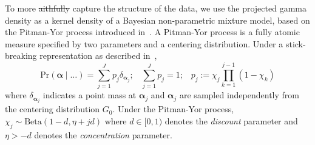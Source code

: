 To more \st{aithfully}  capture the structure of the data, we use the projected gamma density 
    as a kernel density of a Bayesian non-parametric mixture model, based on 
    the Pitman-Yor process introduced in~\cite{perman1992}.  A Pitman-Yor process
    is a fully atomic measure specified by two parameters and a centering
    distribution.  Under a stick-breaking representation as described 
    in~\cite{ishwaran2001}, 
    \begin{equation}
        \label{eqn:stickbreak}
        \text{Pr}(\bm{\alpha}\mid\ldots) 
            = \sum_{j = 1}^Jp_j\delta_{\bm{\alpha}_j};\;\;\;
            \sum_{j=1}^Jp_j = 1;\;\;\;
            p_j := \chi_j\prod_{k = 1}^{j-1}(1 - \chi_k)
    \end{equation}
    where $\delta_{\bm{\alpha}_j}$ indicates a point mass at $\bm{\alpha}_j$ and
    $\bm{\alpha}_j$ are sampled independently from the centering distribution $G_0$.
    Under the Pitman-Yor process, $\chi_j \sim \text{Beta}(1 - d, \eta + jd)$
    where $d \in [0, 1)$ denotes the \emph{discount} parameter and $\eta > -d$
    denotes the \emph{concentration} parameter. 

